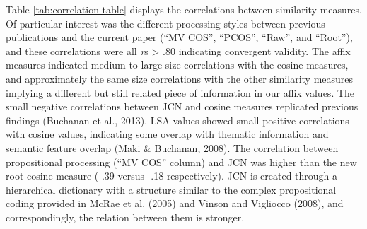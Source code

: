 \documentclass[english,,man]{apa6}
\begin{document}
Table \ref{tab:correlation-table} displays the correlations between similarity measures. Of particular interest was the different processing styles between previous publications and the current paper (\enquote{MV COS}, \enquote{PCOS}, \enquote{Raw}, and \enquote{Root}), and these correlations were all \emph{r}s \textgreater{} .80 indicating convergent validity. The affix measures indicated medium to large size correlations with the cosine measures, and approximately the same size correlations with the other similarity measures implying a different but still related piece of information in our affix values. The small negative correlations between JCN and cosine measures replicated previous findings (Buchanan et al., 2013). LSA values showed small positive correlations with cosine values, indicating some overlap with thematic information and semantic feature overlap (Maki \& Buchanan, 2008). The correlation between propositional processing (\enquote{MV COS} column) and JCN was higher than the new root cosine measure (-.39 versus -.18 respectively). JCN is created through a hierarchical dictionary with a structure similar to the complex propositional coding provided in McRae et al. (2005) and Vinson and Vigliocco (2008), and correspondingly, the relation between them is stronger.
\end{document}
